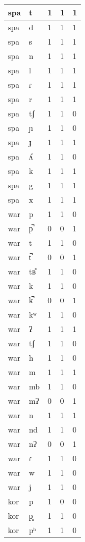 \begin{longtable}{ | l | l | l | l | l | }
	spa & t & 1 & 1 & 1 \\ \hline
	spa & d & 1 & 1 & 1 \\ \hline
	spa & s & 1 & 1 & 1 \\ \hline
	spa & n & 1 & 1 & 1 \\ \hline
	spa & l & 1 & 1 & 1 \\ \hline
	spa & ɾ & 1 & 1 & 1 \\ \hline
	spa & r & 1 & 1 & 1 \\ \hline
	spa & tʃ & 1 & 1 & 0 \\ \hline
	spa & ɲ & 1 & 1 & 0 \\ \hline
	spa & ɟ & 1 & 1 & 1 \\ \hline
	spa & ʎ & 1 & 1 & 0 \\ \hline
	spa & k & 1 & 1 & 1 \\ \hline
	spa & g & 1 & 1 & 1 \\ \hline
	spa & x & 1 & 1 & 1 \\ \hline
	war & p & 1 & 1 & 0 \\ \hline
	war & p̚ & 0 & 0 & 1 \\ \hline
	war & t & 1 & 1 & 0 \\ \hline
	war & t̚ & 0 & 0 & 1 \\ \hline
	war & tʙ̊ & 1 & 1 & 0 \\ \hline
	war & k & 1 & 1 & 0 \\ \hline
	war & k̚ & 0 & 0 & 1 \\ \hline
	war & kʷ & 1 & 1 & 0 \\ \hline
	war & ʔ & 1 & 1 & 1 \\ \hline
	war & tʃ & 1 & 1 & 0 \\ \hline
	war & h & 1 & 1 & 0 \\ \hline
	war & m & 1 & 1 & 1 \\ \hline
	war & mb & 1 & 1 & 0 \\ \hline
	war & mʔ & 0 & 0 & 1 \\ \hline
	war & n & 1 & 1 & 1 \\ \hline
	war & nd & 1 & 1 & 0 \\ \hline
	war & nʔ & 0 & 0 & 1 \\ \hline
	war & ɾ & 1 & 1 & 0 \\ \hline
	war & w & 1 & 1 & 0 \\ \hline
	war & j & 1 & 1 & 0 \\ \hline
	kor & p & 1 & 0 & 0 \\ \hline
	kor & p͈ & 1 & 1 & 0 \\ \hline
	kor & pʰ & 1 & 1 & 0 \\ \hline

\end{longtable}
